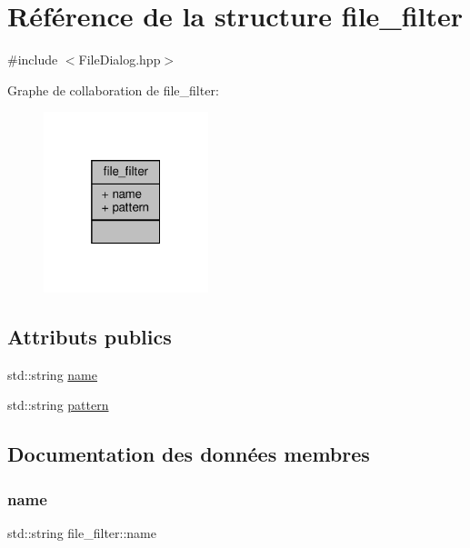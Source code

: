 \hypertarget{structfile__filter}{}\section{Référence de la structure file\+\_\+filter}
\label{structfile__filter}


{\ttfamily \#include $<$File\+Dialog.\+hpp$>$}



Graphe de collaboration de file\+\_\+filter\+:\nopagebreak
\begin{figure}[H]
\begin{center}
\leavevmode
\includegraphics[width=136pt]{structfile__filter__coll__graph}
\end{center}
\end{figure}
\subsection*{Attributs publics}
\begin{DoxyCompactItemize}
\item 
std\+::string \hyperlink{structfile__filter_af5370b9bd78fc87941d5da559f7b32a4}{name}
\item 
std\+::string \hyperlink{structfile__filter_a66658e1ec5a2c6a586d9855f12779a04}{pattern}
\end{DoxyCompactItemize}


\subsection{Documentation des données membres}
\mbox{\label{structfile__filter_af5370b9bd78fc87941d5da559f7b32a4}} 
\subsubsection{\texorpdfstring{name}{name}}
{\footnotesize\ttfamily std\+::string file\+\_\+filter\+::name}

